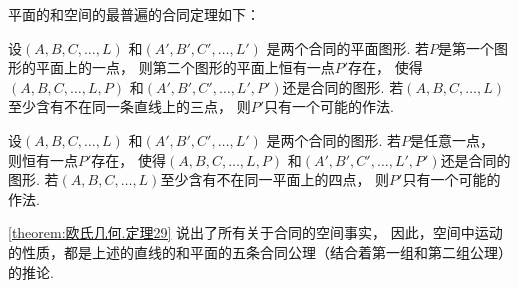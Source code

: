 平面的和空间的最普遍的合同定理如下：
\begin{theorem}\label{theorem:欧氏几何.定理28}
设\((A,B,C,\dotsc,L)\)
和\((A',B',C',\dotsc,L')\)
是两个合同的平面图形.
若\(P\)是第一个图形的平面上的一点，
则第二个图形的平面上恒有一点\(P'\)存在，
使得\((A,B,C,\dotsc,L,P)\)
和\((A',B',C',\dotsc,L',P')\)还是合同的图形.
若\((A,B,C,\dotsc,L)\)至少含有不在同一条直线上的三点，
则\(P'\)只有一个可能的作法.
\end{theorem}

\begin{theorem}\label{theorem:欧氏几何.定理29}
设\((A,B,C,\dotsc,L)\)
和\((A',B',C',\dotsc,L')\)
是两个合同的图形.
若\(P\)是任意一点，
则恒有一点\(P'\)存在，
使得\((A,B,C,\dotsc,L,P)\)
和\((A',B',C',\dotsc,L',P')\)还是合同的图形.
若\((A,B,C,\dotsc,L)\)至少含有不在同一平面上的四点，
则\(P'\)只有一个可能的作法.
\end{theorem}

\cref{theorem:欧氏几何.定理29} 说出了所有关于合同的空间事实，
因此，空间中运动的性质，都是上述的直线的和平面的五条合同公理（结合着第一组和第二组公理）的推论.
